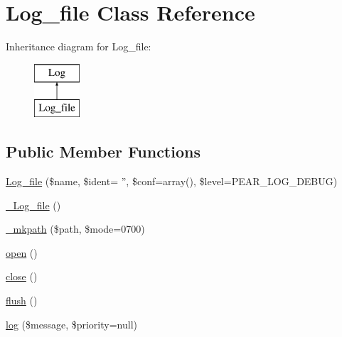 \hypertarget{class_log__file}{
\section{Log\_\-file Class Reference}
\label{class_log__file}
}
Inheritance diagram for Log\_\-file:\begin{figure}[H]
\begin{center}
\leavevmode
\includegraphics[height=2.000000cm]{class_log__file}
\end{center}
\end{figure}
\subsection*{Public Member Functions}
\begin{DoxyCompactItemize}
\item 
\hyperlink{class_log__file_a3fcc2ec61345b8aae0ffa4d9cc0ca006}{Log\_\-file} (\$name, \$ident= '', \$conf=array(), \$level=PEAR\_\-LOG\_\-DEBUG)
\item 
\hyperlink{class_log__file_aba3b3c8cb86a9cf80d34fea392d238a3}{\_\-Log\_\-file} ()
\item 
\hyperlink{class_log__file_a5a80cbae673a436bcf1514d743d9ef34}{\_\-mkpath} (\$path, \$mode=0700)
\item 
\hyperlink{class_log__file_a44a2ac59a3b91f8c18905dce700934d6}{open} ()
\item 
\hyperlink{class_log__file_aa69c8bf1f1dcf4e72552efff1fe3e87e}{close} ()
\item 
\hyperlink{class_log__file_a7751f77b5263bcf940ece6e824a05b38}{flush} ()
\item 
\hyperlink{class_log__file_ac3758dfa38a67df158a446847cf06413}{log} (\$message, \$priority=null)
\end{DoxyCompactItemize}
